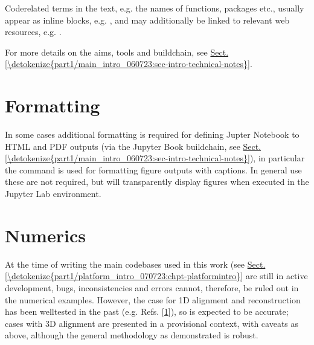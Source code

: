 \documentclass[letterpaper,table,10pt,english]{jupyterBook}
\begin{document}
\sphinxAtStartPar
Code\sphinxhyphen{}related terms in the text, e.g. the names of functions, packages etc., usually appear as in\sphinxhyphen{}line blocks, e.g. , and may additionally be linked to relevant web resources, e.g. .

\sphinxAtStartPar
For more details on the aims, tools and build\sphinxhyphen{}chain, see \hyperref[\detokenize{part1/main_intro_060723:sec-intro-technical-notes}]{Sect.\@ \ref{\detokenize{part1/main_intro_060723:sec-intro-technical-notes}}}.


\section{Formatting}
\label{\detokenize{frontmatter/book_versions_note:formatting}}
\sphinxAtStartPar
In some cases additional formatting is required for defining Jupter Notebook to HTML and PDF outputs (via the Jupyter Book build\sphinxhyphen{}chain, see \hyperref[\detokenize{part1/main_intro_060723:sec-intro-technical-notes}]{Sect.\@ \ref{\detokenize{part1/main_intro_060723:sec-intro-technical-notes}}}), in particular the  command is used for formatting figure outputs with captions. In general use these are not required, but will transparently display figures when executed in the Jupyter Lab environment.


\section{Numerics}
\label{\detokenize{frontmatter/book_versions_note:numerics}}\label{\detokenize{frontmatter/book_versions_note:sec-numerics-disclaimer}}
\sphinxAtStartPar
At the time of writing the main code\sphinxhyphen{}bases used in this work (see \hyperref[\detokenize{part1/platform_intro_070723:chpt-platformintro}]{Sect.\@ \ref{\detokenize{part1/platform_intro_070723:chpt-platformintro}}} are still in active development, bugs, inconsistencies and errors cannot, therefore, be ruled out in the numerical examples. However, the case for 1D alignment and reconstruction has been well\sphinxhyphen{}tested in the past (e.g. Refs. {[}\hyperlink{cite.backmatter/bibliography:id758}{1}{]}), so is expected to be accurate; cases with 3D alignment are presented in a provisional context, with caveats as above, although the general methodology as demonstrated is robust.

\sphinxstepscope
\end{document}
